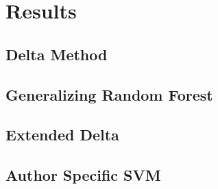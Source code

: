 \section{Results}

\subsection{Delta Method}

\subsection{Generalizing Random Forest}

\subsection{Extended Delta}

\subsection{Author Specific SVM}
